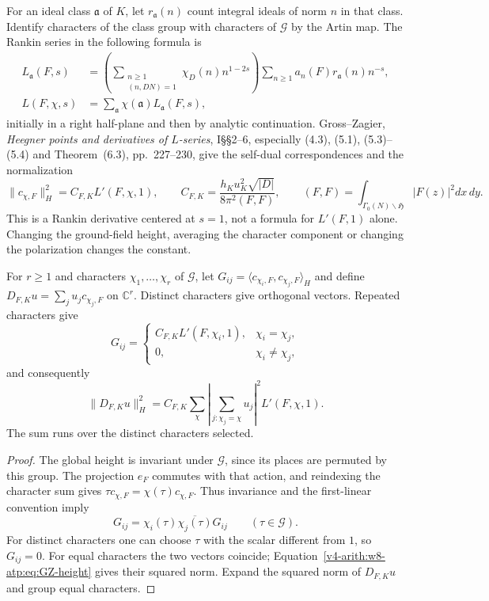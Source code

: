 For an ideal class $\mathfrak a$ of $K$, let $r_{\mathfrak a}(n)$ count
integral ideals of norm $n$ in that class. Identify characters of the
class group with characters of $\mathcal G$ by the Artin map. The
Rankin series in the following formula is
\[
 \begin{split}
 L_{\mathfrak a}(F,s)
 &=\left(\sum_{\substack{n\geq1\\(n,DN)=1}}\chi_D(n)n^{1-2s}\right)
       \sum_{n\geq1}a_n(F)r_{\mathfrak a}(n)n^{-s},\\
 L(F,\chi,s)&=\sum_{\mathfrak a}\chi(\mathfrak a)L_{\mathfrak a}(F,s),
 \end{split}
\]
initially in a right half-plane and then by analytic continuation.
Gross--Zagier, \emph{Heegner points and derivatives of $L$-series},
I\S\S2--6, especially (4.3), (5.1), (5.3)--(5.4) and Theorem~(6.3),
pp.~227--230, give the self-dual correspondences and the normalization
\begin{equation}
\label{v4-arith:w8-atp:eq:GZ-height}
 \|c_{\chi,F}\|_H^2=C_{F,K}L'(F,\chi,1),\qquad
 C_{F,K}=\frac{h_Ku_K^2\sqrt{|D|}}{8\pi^2(F,F)},\qquad
 (F,F)=\int_{\Gamma_0(N)\backslash\mathfrak H}|F(z)|^2dx\,dy.
\end{equation}
This is a Rankin derivative centered at $s=1$, not a formula for
$L'(F,1)$ alone. Changing the ground-field height, averaging the
character component or changing the polarization changes the constant.

\begin{lemma}
\label{v4-arith:w8-atp:lem:character-gram}
For $r\geq1$ and characters $\chi_1,\ldots,\chi_r$ of $\mathcal G$, let
$G_{ij}=\langle c_{\chi_i,F},c_{\chi_j,F}\rangle_H$ and define
$D_{F,K}u=\sum_j u_jc_{\chi_j,F}$ on $\mathbb C^r$.
Distinct characters give orthogonal vectors. Repeated characters give
\[
 G_{ij}=
 \begin{cases}C_{F,K}L'(F,\chi_i,1),&\chi_i=\chi_j,\\
 0,&\chi_i\ne\chi_j,
 \end{cases}
\]
and consequently
\[
 \|D_{F,K}u\|_H^2
 =C_{F,K}\sum_{\chi}
       \left|\sum_{j:\chi_j=\chi}u_j\right|^2L'(F,\chi,1).
\]
The sum runs over the distinct characters selected.
\end{lemma}
\begin{proof}
The global height is invariant under $\mathcal G$, since its places
are permuted by this group. The projection $e_F$ commutes with that
action, and reindexing the character sum gives
$\tau c_{\chi,F}=\chi(\tau)c_{\chi,F}$.
Thus invariance and the first-linear convention imply
\[
 G_{ij}=\chi_i(\tau)\overline{\chi_j(\tau)}G_{ij}
 \qquad(\tau\in\mathcal G).
\]
For distinct characters one can choose $\tau$ with the scalar different
from $1$, so $G_{ij}=0$. For equal characters the two vectors coincide;
Equation~\eqref{v4-arith:w8-atp:eq:GZ-height} gives their squared norm.
Expand the squared norm of $D_{F,K}u$ and group equal characters.
\end{proof}

